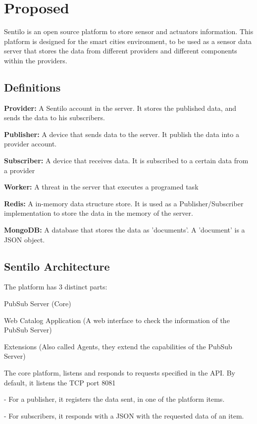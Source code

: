 \section{Proposed}

Sentilo is an open source platform to store sensor and actuators information.
This platform is designed for the smart cities environment,
	to be used as a sensor data server that stores the data from different providers and different components within the providers.

\subsection{Definitions}

\textbf{Provider:} A Sentilo account in the server. It stores the published data, and
sends the data to his subscribers.

\textbf{Publisher:} A device that sends data to the server. It publish the data into a
provider account.

\textbf{Subscriber:} A device that receives data. It is subscribed to a certain data from a
provider

\textbf{Worker:} A threat in the server that executes a programed task

\textbf{Redis:} A in-memory data structure store. It is used as a Publisher/Subscriber
implementation to store the data in the memory of the server.

\textbf{MongoDB:} A database that stores the data as 'documents'. A 'document' is a
JSON object.


\subsection{Sentilo Architecture}

The platform has 3 distinct parts:

PubSub Server (Core)

Web Catalog Application (A web interface to check the information of the
PubSub Server)

Extensions (Also called Agents, they extend the capabilities of the PubSub
Server)

The core platform, listens and responds to requests specified in the API. By default,
it listens the TCP port 8081

- For a publisher, it registers the data sent, in one of the platform items.

- For subscribers, it responds with a JSON with the requested data of an item.

